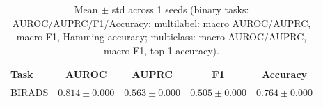 \begin{table}[h]
\centering
\begin{tabular}{l|cccc}
\hline
Task & AUROC & AUPRC & F1 & Accuracy \\
\hline
BIRADS & $0.814 \pm 0.000$ & $0.563 \pm 0.000$ & $0.505 \pm 0.000$ & $0.764 \pm 0.000$ \\
\hline
\end{tabular}
\caption{Mean $\pm$ std across 1 seeds (binary tasks: AUROC/AUPRC/F1/Accuracy; multilabel: macro AUROC/AUPRC, macro F1, Hamming accuracy; multiclass: macro AUROC/AUPRC, macro F1, top-1 accuracy).}
\end{table}
